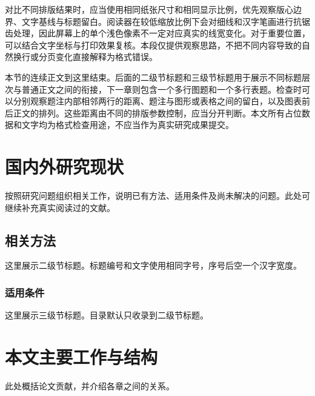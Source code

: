 对比不同排版结果时，应当使用相同纸张尺寸和相同显示比例，优先观察版心边界、文字基线与标题留白。阅读器在较低缩放比例下会对细线和汉字笔画进行抗锯齿处理，因此屏幕上的单个浅色像素不一定对应真实的线宽变化。对于重要位置，可以结合文字坐标与打印效果复核。本段仅提供观察思路，不把不同内容导致的自然换行或分页变化直接解释为格式错误。

本节的连续正文到这里结束。后面的二级节标题和三级节标题用于展示不同标题层次与普通正文之间的衔接，下一章则包含一个多行图题和一个多行表题。检查时可以分别观察题注内部相邻两行的距离、题注与图形或表格之间的留白，以及图表前后正文的排列。这些距离由不同的排版参数控制，应当分开判断。本文所有占位数据和文字均为格式检查用途，不应当作为真实研究成果提交。

\section{国内外研究现状}
按照研究问题组织相关工作，说明已有方法、适用条件及尚未解决的问题。此处可继续补充真实阅读过的文献。
\subsection{相关方法}
这里展示二级节标题。标题编号和文字使用相同字号，序号后空一个汉字宽度。
\subsubsection{适用条件}
这里展示三级节标题。目录默认只收录到二级节标题。
\section{本文主要工作与结构}
此处概括论文贡献，并介绍各章之间的关系。
